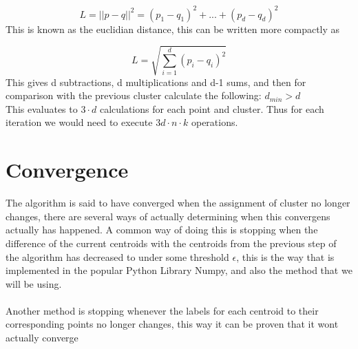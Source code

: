 \documentclass[12pt]{report}
\begin{document}
\begin{equation}
  L = ||p - q||^2 = (p_1 - q_1)^2 +...+(p_d - q_d)^2
\end{equation}
This is known as the euclidian distance, this can be written more compactly as

\begin{equation}
  L = \sqrt{\sum_{i=1}^d(p_i - q_i)^2}
\end{equation}
This gives d subtractions, d multiplications and d-1 sums, and then for comparison with the previous cluster calculate the following: $d_{min} > d$ \\
This evaluates to $3\cdot d$ calculations for each point and cluster. Thus for each iteration we would need to execute $3d \cdot n \cdot k$ operations.

\section{Convergence}
\label{subsec:Convergens}
The algorithm is said to have converged when the assignment of cluster no longer changes, there are several ways of actually determining when this convergens actually has happened. A common way of doing this is stopping when the difference of the current centroids with the centroids from the previous step of the algorithm has decreased to under some threshold $\epsilon$, this is the way that is implemented in the popular Python Library Numpy, and also the method that we will be using. \\\\
Another method is stopping whenever the labels for each centroid to their corresponding points no longer changes, this way it can be proven that it wont actually converge
\end{document}
